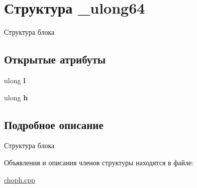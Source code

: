 \hypertarget{struct__ulong64}{}\section{Структура \+\_\+ulong64}
\label{struct__ulong64}


Структура блока  


\subsection*{Открытые атрибуты}
\begin{DoxyCompactItemize}
\item 
\mbox{\label{struct__ulong64_a7332ddd1b4f726a1bbc6f99464e571da}} 
ulong {\bfseries l}
\item 
\mbox{\label{struct__ulong64_a0f35f177de9a2d37ea5af05bc54f78bd}} 
ulong {\bfseries h}
\end{DoxyCompactItemize}


\subsection{Подробное описание}
Структура блока 

Объявления и описания членов структуры находятся в файле\+:\begin{DoxyCompactItemize}
\item 
\hyperlink{choph_8cpp}{choph.\+cpp}\end{DoxyCompactItemize}
